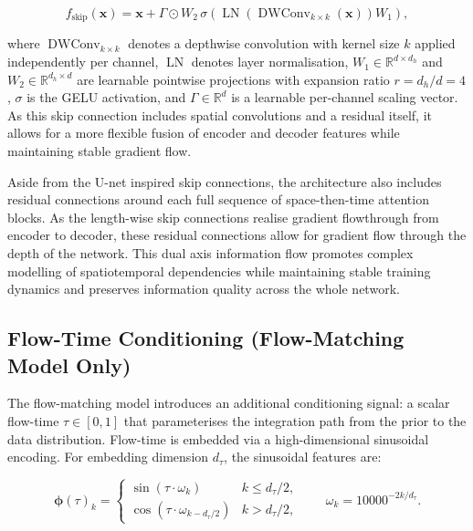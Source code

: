 \begin{equation}
    f_{\text{skip}}(\mathbf{x})
    =
    \mathbf{x}
    +
    \Gamma \odot
    W_2\,\sigma\!\left(
        \operatorname{LN}\!\left(
            \operatorname{DWConv}_{k\times k}(\mathbf{x})
        \right)
        W_1
    \right),
\end{equation}

where $\operatorname{DWConv}_{k\times k}$ denotes a depthwise convolution with kernel size $k$ applied independently per channel, $\operatorname{LN}$ denotes layer normalisation, $W_1 \in \mathbb{R}^{d \times d_h}$ and $W_2 \in \mathbb{R}^{d_h \times d}$ are learnable pointwise projections with expansion ratio $r = d_h/d = 4$, $\sigma$ is the GELU activation, and $\Gamma \in \mathbb{R}^{d}$ is a learnable per-channel scaling vector. As this skip connection includes spatial convolutions and a residual itself, it allows for a more flexible fusion of encoder and decoder features while maintaining stable gradient flow.

Aside from the U-net inspired skip connections, the architecture also includes residual connections around each full sequence of space-then-time attention blocks. As the length-wise skip connections realise gradient flowthrough from encoder to decoder, these residual connections allow for gradient flow through the depth of the network. This dual axis information flow promotes complex modelling of spatiotemporal dependencies while maintaining stable training dynamics and preserves information quality across the whole network.

\subsection{Flow-Time Conditioning (Flow-Matching Model Only)}

The flow-matching model introduces an additional conditioning signal: a scalar flow-time $\tau \in [0, 1]$ that parameterises the integration path from the prior to the data distribution. Flow-time is embedded via a high-dimensional sinusoidal encoding. For embedding dimension $d_\tau$, the sinusoidal features are:

\begin{equation}
    \boldsymbol{\phi}(\tau)_k = \begin{cases}
        \sin\!\left(\tau \cdot \omega_k\right) & k \leq d_\tau/2, \\
        \cos\!\left(\tau \cdot \omega_{k - d_\tau/2}\right) & k > d_\tau/2,
    \end{cases}
    \qquad \omega_k = 10000^{-2k/d_\tau}.
\end{equation}

